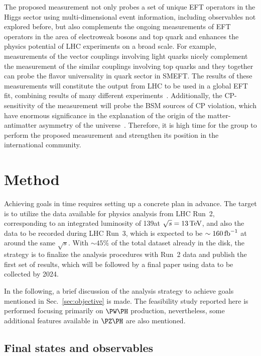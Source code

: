 \documentclass[a4paper,11pt]{article}
\begin{document}
The proposed measurement not only probes a set of unique EFT operators in the Higgs sector using multi-dimensional event information, including observables not explored before, 
but also complements the ongoing measurements of EFT operators in the area of electroweak bosons and top quark and enhances the physics potential of LHC experiments on a broad scale. 
For example, measurements of the vector couplings involving light quarks nicely complement the measurement of the similar couplings involving top quarks and they together can probe the flavor universality in quark sector in SMEFT.
The results of these measurements will constitute the output from LHC to be used in a global EFT fit, combining results of many different experiments~\cite{Ellis:2018gqa,Ethier:2021bye}.
Additionally, the CP-sensitivity of the measurement will probe the BSM sources of CP violation, 
which have enormous significance in the explanation of the origin of the matter-antimatter asymmetry of the universe~\cite{Cohen:1997ac,Damgaard:2015con,Grzadkowski:2018nbc}.
Therefore, it is high time for the group to perform the proposed measurement and strengthen its position in the international community. 

\section{Method}
\label{sec:method}

Achieving goals in time requires setting up a concrete plan in advance. 
The target is to utilize the data available for physics analysis from LHC Run~2, corresponding to an integrated luminosity of 139\fbinv at $\sqrt{s}=13\,\text{Te\hspace{-.08em}V}$, and also the data to be recorded during LHC Run~3, which is expected to be $\sim 160\mbox{\ensuremath{\,\text{fb}^{-1}}}$ at around the same $\sqrt{s}$. 
With $\sim 45\%$ of the total dataset already in the disk, the strategy is to finalize the analysis procedures with Run~2 data and publish the first set of results, which will be followed by a final paper using data to be collected by 2024. 

In the following, a brief discussion of the analysis strategy to achieve goals mentioned in Sec.~\ref{sec:objective} is made. The feasibility study reported here is performed focusing primarily on $\PW\PH$ production, 
nevertheless, some additional features available in $\PZ\PH$ are also mentioned. 

\subsection{Final states and observables}
\end{document}
